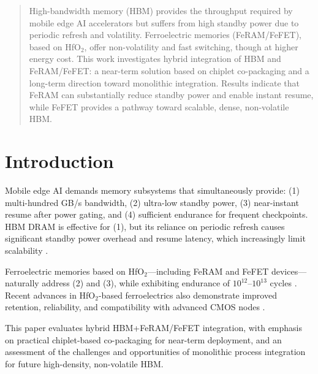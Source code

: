 \begin{abstract}
High-bandwidth memory (HBM) provides the throughput required by mobile edge AI accelerators but suffers from high standby power due to periodic refresh and volatility. 
Ferroelectric memories (FeRAM/FeFET), based on HfO$_2$, offer non-volatility and fast switching, though at higher energy cost. 
This work investigates hybrid integration of HBM and FeRAM/FeFET: a near-term solution based on chiplet co-packaging and a long-term direction toward monolithic integration. 
Results indicate that FeRAM can substantially reduce standby power and enable instant resume, while FeFET provides a pathway toward scalable, dense, non-volatile HBM.
\end{abstract}

\section{Introduction}
Mobile edge AI demands memory subsystems that simultaneously provide:
(1) multi-hundred GB/s bandwidth, 
(2) ultra-low standby power, 
(3) near-instant resume after power gating, and 
(4) sufficient endurance for frequent checkpoints.
HBM DRAM is effective for (1), but its reliance on periodic refresh causes significant standby power overhead and resume latency, which increasingly limit scalability \cite{ChoiIEDM2022,KimIEDM2021}.  

Ferroelectric memories based on HfO$_2$---including FeRAM and FeFET devices---naturally address (2) and (3), while exhibiting endurance of $10^{12}$–$10^{13}$ cycles \cite{MuellerIEDM2012,MartinVLSI2020}. 
Recent advances in HfO$_2$-based ferroelectrics also demonstrate improved retention, reliability, and compatibility with advanced CMOS nodes \cite{NohedaNature2023}.  

This paper evaluates hybrid HBM+FeRAM/FeFET integration, with emphasis on practical chiplet-based co-packaging for near-term deployment, and an assessment of the challenges and opportunities of monolithic process integration for future high-density, non-volatile HBM.
